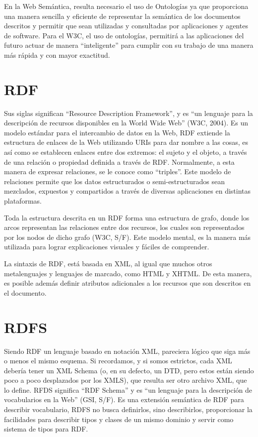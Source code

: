 En la Web Semántica, resulta necesario el uso de Ontologías ya que proporciona una manera sencilla y eficiente de representar la semántica de los documentos descritos y permitir que sean utilizadas y consultadas por aplicaciones y agentes de software. Para el W3C, el uso de ontologías, permitirá a las aplicaciones del futuro actuar de manera ``inteligente'' para cumplir con su trabajo de una manera más rápida y con mayor exactitud.

\section{RDF}

Sus siglas significan ``Resource Description Framework'', y es ``un lenguaje para la descripción de recursos disponibles en la World Wide Web'' (W3C, 2004). Es un modelo estándar para el intercambio de datos en la Web, RDF extiende la estructura de enlaces de la Web utilizando URIs para dar nombre a las cosas, es así como se establecen enlaces entre dos extremos: el sujeto y el objeto, a través de una relación o propiedad definida a través de RDF. Normalmente, a esta manera de expresar relaciones, se le conoce como ``triples''. Este modelo de relaciones permite que los datos estructurados o semi-estructurados sean mezclados, expuestos y compartidos a través de diversas aplicaciones en distintas plataformas.

Toda la estructura descrita en un RDF forma una estructura de grafo, donde los arcos representan las relaciones entre dos recursos, los cuales son representados por los nodos de dicho grafo (W3C, S/F). Este modelo mental, es la manera más utilizada para lograr explicaciones visuales y fáciles de comprender.

La sintaxis de RDF, está basada en XML, al igual que muchos otros metalenguajes y lenguajes de marcado, como HTML y XHTML. De esta manera, es posible además definir atributos adicionales a los recursos que son descritos en el documento.

\section{RDFS}

Siendo RDF un lenguaje basado en notación XML, pareciera lógico que siga más o menos el mismo esquema. Si recordamos, y si somos estrictos, cada XML debería tener un XML Schema (o, en su defecto, un DTD, pero estos están siendo poco a poco desplazados por los XMLS), que resulta ser otro archivo XML, que lo define. RFDS significa ``RDF Schema'' y es ``un lenguaje para la descripción de vocabularios en la Web'' (GSI, S/F). Es una extensión semántica de RDF para describir vocabulario, RDFS no busca definirlos, sino describirlos, proporcionar la facilidades para describir tipos y clases de un mismo dominio y servir como sistema de tipos para RDF.

